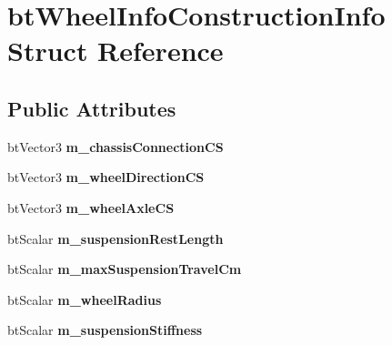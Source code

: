 \hypertarget{structbtWheelInfoConstructionInfo}{}\section{bt\+Wheel\+Info\+Construction\+Info Struct Reference}
\label{structbtWheelInfoConstructionInfo}
\subsection*{Public Attributes}
\begin{DoxyCompactItemize}
\item 
\mbox{\label{structbtWheelInfoConstructionInfo_ace9733519c81df42d2362231ec68eaae}} 
bt\+Vector3 {\bfseries m\+\_\+chassis\+Connection\+CS}
\item 
\mbox{\label{structbtWheelInfoConstructionInfo_a37851da19fce1c3ef01c65ec60ea7154}} 
bt\+Vector3 {\bfseries m\+\_\+wheel\+Direction\+CS}
\item 
\mbox{\label{structbtWheelInfoConstructionInfo_a35f8baf5ada324e7d60e3a3b51d17e00}} 
bt\+Vector3 {\bfseries m\+\_\+wheel\+Axle\+CS}
\item 
\mbox{\label{structbtWheelInfoConstructionInfo_a0a57ff5c5688b689a766583e058c8183}} 
bt\+Scalar {\bfseries m\+\_\+suspension\+Rest\+Length}
\item 
\mbox{\label{structbtWheelInfoConstructionInfo_abc6f20187127b76600a6abec4e070c3d}} 
bt\+Scalar {\bfseries m\+\_\+max\+Suspension\+Travel\+Cm}
\item 
\mbox{\label{structbtWheelInfoConstructionInfo_a762cacf6a7c9892039a55ae1a35d4833}} 
bt\+Scalar {\bfseries m\+\_\+wheel\+Radius}
\item 
\mbox{\label{structbtWheelInfoConstructionInfo_ac7fa423c96deb5101767072cea14341e}} 
bt\+Scalar {\bfseries m\+\_\+suspension\+Stiffness}
\item 
\mbox{\label{structbtWheelInfoConstructionInfo_a5b277a9060b3a47d93eb09321c62dce2}} 

\end{DoxyCompactItemize}
